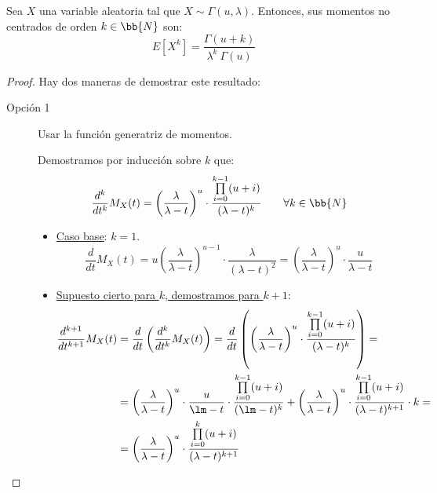 \begin{prop}
    Sea $X$ una variable aleatoria tal que $X\sim \Gamma(u,\lambda)$. Entonces, sus momentos no centrados de orden $k\in \bb{N}$ son:
    \begin{equation*}
        E[X^k] = \dfrac{\Gamma(u+k)}{\lambda^k~\Gamma(u)}
    \end{equation*}
\end{prop}
\begin{proof}
    Hay dos maneras de demostrar este resultado:
    \begin{description}
        \item[Opción 1] Usar la función generatriz de momentos.
        
        Demostramos por inducción sobre $k$ que:
        \begin{equation*}
            \dfrac{d^k}{dt^k} M_X(t) = \left(\dfrac{\lambda}{\lambda-t}\right)^u \cdot \dfrac{\prod\limits_{i=0}^{k-1}(u+i)}{(\lambda-t)^k}
            \qquad \forall k\in \bb{N}
        \end{equation*}
        \begin{itemize}
            \item \ul{Caso base}: $k=1$.
            \begin{equation*}
                \dfrac{d}{dt} M_X(t)
                = u\left( \dfrac{\lambda}{\lambda-t} \right)^{u-1} \cdot \dfrac{\lambda}{(\lambda-t)^2}
                = \left( \dfrac{\lambda}{\lambda-t} \right)^u \cdot \dfrac{u}{\lambda-t}
            \end{equation*}

            \item \ul{Supuesto cierto para $k$, demostramos para $k+1$}:
            \begin{align*}
                \dfrac{d^{k+1}}{dt^{k+1}} M_X(t) &= \dfrac{d}{dt} \left( \dfrac{d^k}{dt^k} M_X(t) \right)
                = \dfrac{d}{dt} \left( \left(\dfrac{\lambda}{\lambda-t}\right)^u \cdot \dfrac{\prod\limits_{i=0}^{k-1}(u+i)}{(\lambda-t)^k} \right)
                =\\&= \left(\dfrac{\lambda}{\lambda-t}\right)^u \cdot \dfrac{u}{\lm-t}
                \cdot \dfrac{\prod\limits_{i=0}^{k-1}(u+i)}{(\lm-t)^k}
                + \left(\dfrac{\lambda}{\lambda-t}\right)^u \cdot \dfrac{\prod\limits_{i=0}^{k-1}(u+i)}{(\lambda-t)^{k+1}} \cdot k
                =\\&= \left(\dfrac{\lambda}{\lambda-t}\right)^u \cdot \dfrac{\prod\limits_{i=0}^{k}(u+i)}{(\lambda-t)^{k+1}}
            \end{align*}        
        \end{itemize}


\end{description}
\end{proof}
